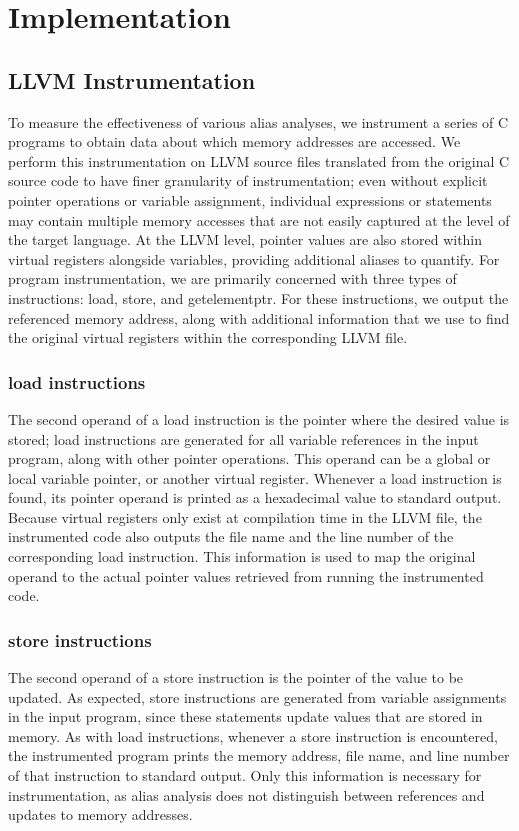 \chapter{Implementation}

\section{LLVM Instrumentation}
To measure the effectiveness of various alias analyses, we instrument a series of C programs to obtain data about which memory addresses are accessed. We perform this instrumentation on LLVM source files translated from the original C source code to have finer granularity of instrumentation; even without explicit pointer operations or variable assignment, individual expressions or statements may contain multiple memory accesses that are not easily captured at the level of the target language. At the LLVM level, pointer values are also stored within virtual registers alongside variables, providing additional aliases to quantify. For program instrumentation, we are primarily concerned with three types of instructions: load, store, and getelementptr. For these instructions, we output the referenced memory address, along with additional information that we use to find the original virtual registers within the corresponding LLVM file.

\subsection{load instructions}
The second operand of a load instruction is the pointer where the desired value is stored; load instructions are generated for all variable references in the input program, along with other pointer operations. This operand can be a global or local variable pointer, or another virtual register. Whenever a load instruction is found, its pointer operand is printed as a hexadecimal value to standard output. Because virtual registers only exist at compilation time in the LLVM file, the instrumented code also outputs the file name and the line number of the corresponding load instruction. This information is used to map the original operand to the actual pointer values retrieved from running the instrumented code.

\subsection{store instructions}
The second operand of a store instruction is the pointer of the value to be updated. As expected, store instructions are generated from variable assignments in the input program, since these statements update values that are stored in memory. As with load instructions, whenever a store instruction is encountered, the instrumented program prints the memory address, file name, and line number of that instruction to standard output. Only this information is necessary for instrumentation, as alias analysis does not distinguish between references and updates to memory addresses.

